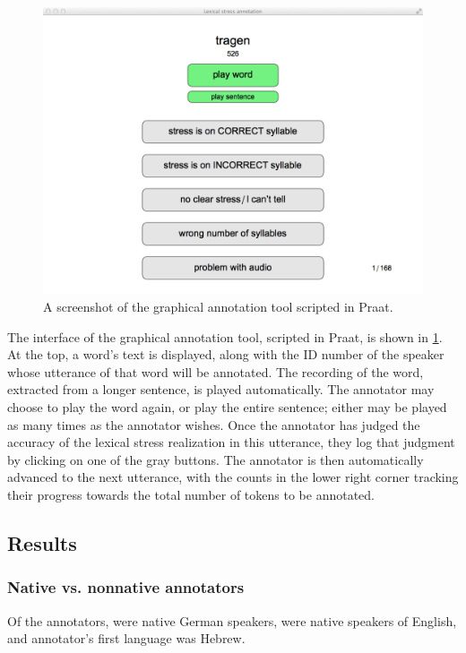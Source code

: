 	
		\begin{figure}
		\centering
		\includegraphics[width=\textwidth]{../img/screenshots/AnnotationTool}
		\caption{A screenshot of the graphical annotation tool scripted in Praat.  }
		\label{fig:annotationtool}
	\end{figure}
	
	The interface of the graphical annotation tool, scripted in Praat, is shown in \cref{fig:annotationtool}. At the top, a word's text is displayed, along with the ID number of the speaker whose utterance of that word will be annotated. The recording of the word, extracted from a longer sentence, is played automatically. The annotator may choose to play the word again, or play the entire sentence; either may be played as many times as the annotator wishes. Once the annotator has judged the accuracy of the lexical stress realization in this utterance, they log that judgment by clicking on one of the gray buttons. The annotator is then automatically advanced to the next utterance, with the counts in the lower right corner tracking their progress towards the total number of tokens to be annotated. 
	
	\subsection{Results}
		\subsubsection{Native vs. nonnative annotators}

		Of the \TODO annotators, \TODO were native German speakers,  were native speakers of English, and  annotator's first language was Hebrew. 

